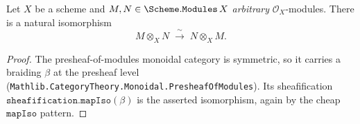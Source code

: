 \begin{lemma}\leanok
  \label{lem:tensorobj_comm_iso}
  Let \(X\) be a scheme and \(M, N \in \Scheme.\mathtt{Modules}\,X\)
  \emph{arbitrary} \(\mathcal{O}_X\)-modules. There is a natural isomorphism
  \[
    M \otimes_X N \;\xrightarrow{\ \sim\ }\; N \otimes_X M .
  \]
\end{lemma}

\begin{proof}
  \leanok
  The presheaf-of-modules monoidal category is symmetric, so it carries a
  braiding \(\beta\) at the presheaf level
  (\texttt{Mathlib.CategoryTheory.Monoidal.PresheafOfModules}). Its
  sheafification \(\mathtt{sheafification.mapIso}(\beta)\) is the asserted
  isomorphism, again by the cheap \(\mathtt{mapIso}\) pattern.
\end{proof}

